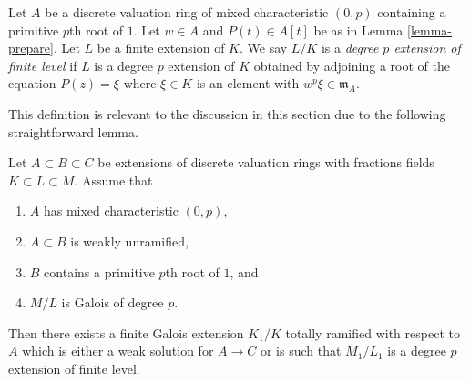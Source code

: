 \noindent
Let $A$ be a discrete valuation ring of mixed characteristic $(0, p)$
containing a primitive $p$th root of $1$. Let $w \in A$ and $P(t) \in A[t]$
be as in Lemma \ref{lemma-prepare}. Let $L$ be a finite extension of $K$.
We say $L/K$ is a {\it degree $p$ extension of finite level}
if $L$ is a degree $p$ extension of $K$ obtained by adjoining a
root of the equation $P(z) = \xi$ where $\xi \in K$ is an
element with $w^p \xi \in \mathfrak m_A$.

\medskip\noindent
This definition is relevant to the discussion in this section due
to the following straightforward lemma.

\begin{lemma}
\label{lemma-make-finite-level}
Let $A \subset B \subset C$ be extensions of discrete valuation rings
with fractions fields $K \subset L \subset M$. Assume that
\begin{enumerate}
\item $A$ has mixed characteristic $(0, p)$,
\item $A \subset B$ is weakly unramified,
\item $B$ contains a primitive $p$th root of $1$, and
\item $M/L$ is Galois of degree $p$.
\end{enumerate}
Then there exists a finite Galois extension $K_1/K$ totally ramified
with respect to $A$ which is either a weak solution for $A \to C$
or is such that $M_1/L_1$ is a degree $p$ extension of finite level.
\end{lemma}

